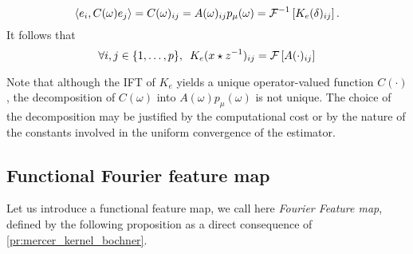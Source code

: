 \begin{equation}
\label{eq:operator_identification_real}\langle e_i,C(\omega)e_j\rangle=C(\omega)_{ij}=A(\omega)_{ij}p_{\mu}(\omega)=\mathcal{F}^{-1}\left[K_e(\delta)_{ij}\right].
\end{equation}
It follows that
\begin{equation}\label{eq:matrix-exp}
\forall i,j \in {\left\{1, \ldots, p\right\}}, \enskip K_e(x\star {z}^{-1})_{ij}= \mathcal{F}\left[A(\cdot)_{ij}\right]
\end{equation}

\begin{remark}
Note that although the \acl{IFT} of $K_e$ yields a unique operator-valued function $C(\cdot)$, the decomposition of $C(\omega)$ into $A(\omega)p_\mu(\omega)$ is not unique. The choice of the decomposition may be justified by the computational cost or by the nature of the constants involved in the uniform convergence of the estimator.
\end{remark}

\subsection{Functional Fourier feature map}
Let us introduce a functional feature map, we call here \emph{Fourier Feature map}, defined by the following proposition as a direct consequence of \cref{pr:mercer_kernel_bochner}.

